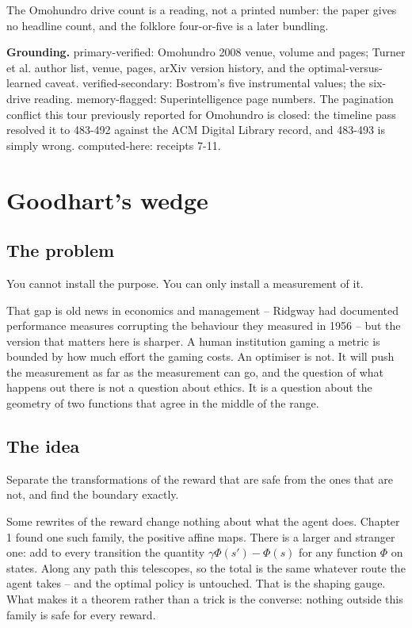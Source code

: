 The Omohundro drive count is a reading, not a printed number: the paper gives no headline count, and the folklore four-or-five is a later bundling.

\textbf{Grounding.} primary-verified: Omohundro 2008 venue, volume and pages; Turner et al. author list, venue, pages, arXiv version history, and the optimal-versus-learned caveat. verified-secondary: Bostrom's five instrumental values; the six-drive reading. memory-flagged: Superintelligence page numbers. The pagination conflict this tour previously reported for Omohundro is closed: the timeline pass resolved it to 483-492 against the ACM Digital Library record, and 483-493 is simply wrong. computed-here: receipts 7-11.

\chapter{Goodhart's wedge}

\section*{The problem}

You cannot install the purpose. You can only install a measurement of it.

That gap is old news in economics and management -- Ridgway had documented performance measures corrupting the behaviour they measured in 1956 -- but the version that matters here is sharper. A human institution gaming a metric is bounded by how much effort the gaming costs. An optimiser is not. It will push the measurement as far as the measurement can go, and the question of what happens out there is not a question about ethics. It is a question about the geometry of two functions that agree in the middle of the range.

\section*{The idea}

Separate the transformations of the reward that are safe from the ones that are not, and find the boundary exactly.

Some rewrites of the reward change nothing about what the agent does. Chapter 1 found one such family, the positive affine maps. There is a larger and stranger one: add to every transition the quantity $\gamma \Phi(s') - \Phi(s)$ for any function $\Phi$ on states. Along any path this telescopes, so the total is the same whatever route the agent takes -- and the optimal policy is untouched. That is the shaping gauge. What makes it a theorem rather than a trick is the converse: nothing outside this family is safe for every reward.

